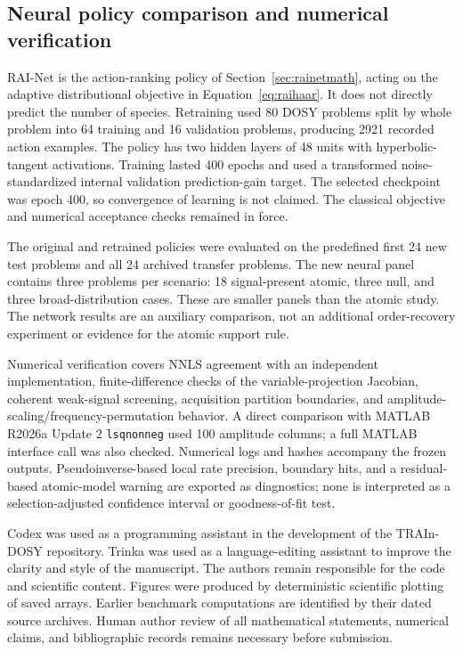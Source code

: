 \subsection{Neural policy comparison and numerical verification}
RAI-Net is the action-ranking policy of Section~\ref{sec:rainetmath}, acting on the adaptive distributional objective in Equation~\eqref{eq:raihaar}. It does not directly predict the number of species. Retraining used 80 DOSY problems split by whole problem into 64 training and 16 validation problems, producing 2921 recorded action examples. The policy has two hidden layers of 48 units with hyperbolic-tangent activations. Training lasted 400 epochs and used a transformed noise-standardized internal validation prediction-gain target. The selected checkpoint was epoch 400, so convergence of learning is not claimed. The classical objective and numerical acceptance checks remained in force.

The original and retrained policies were evaluated on the predefined first 24 new test problems and all 24 archived transfer problems. The new neural panel contains three problems per scenario: 18 signal-present atomic, three null, and three broad-distribution cases. These are smaller panels than the atomic study. The network results are an auxiliary comparison, not an additional order-recovery experiment or evidence for the atomic support rule.

Numerical verification covers NNLS agreement with an independent implementation, finite-difference checks of the variable-projection Jacobian, coherent weak-signal screening, acquisition partition boundaries, and amplitude-scaling/frequency-permutation behavior. A direct comparison with MATLAB R2026a Update 2 \texttt{lsqnonneg} used 100 amplitude columns; a full MATLAB interface call was also checked. Numerical logs and hashes accompany the frozen outputs. Pseudoinverse-based local rate precision, boundary hits, and a residual-based atomic-model warning are exported as diagnostics; none is interpreted as a selection-adjusted confidence interval or goodness-of-fit test.

Codex was used as a programming assistant in the development of the TRAIn-DOSY repository. Trinka was used as a language-editing assistant to improve the clarity and style of the manuscript. The authors remain responsible for the code and scientific content. Figures were produced by deterministic scientific plotting of saved arrays. Earlier benchmark computations are identified by their dated source archives. Human author review of all mathematical statements, numerical claims, and bibliographic records remains necessary before submission.
